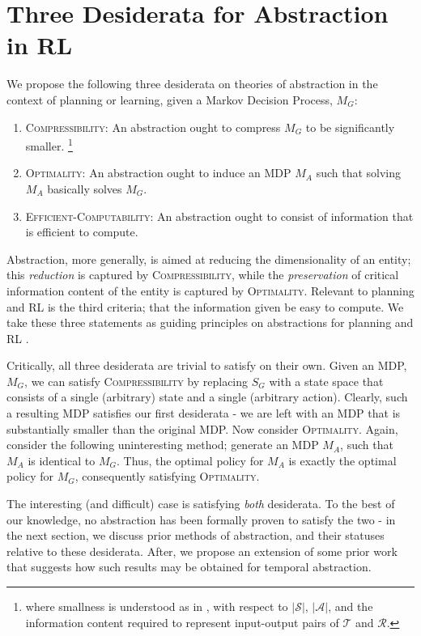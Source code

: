 \section{Three Desiderata for Abstraction in RL}

We propose the following three desiderata on theories of abstraction in the context of planning or learning, given a Markov Decision Process, $M_G$:
\begin{enumerate}
\item \textsc{Compressibility}: An abstraction ought to compress $M_G$ to be significantly smaller. \footnote{where smallness is understood as in \cite{littman1995complexity}, with respect to $|\mathcal{S}|$, $|\mathcal{A}|$, and the information content required to represent input-output pairs of $\mathcal{T}$ and $\mathcal{R}$.}
\item \textsc{Optimality}: An abstraction ought to induce an MDP $M_A$ such that solving $M_A$ basically solves $M_G$.
\item \textsc{Efficient-Computability}: An abstraction ought to consist of information that is efficient to compute.
\end{enumerate}

Abstraction, more generally, is aimed at reducing the dimensionality of an entity; this {\it reduction} is captured by \textsc{Compressibility}, while the {\it preservation} of critical information content of the entity is captured by \textsc{Optimality}. Relevant to planning and RL is the third criteria; that the information given be easy to compute. We take these three statements as guiding principles on abstractions for planning and \ac{RL} .

Critically, all three desiderata are trivial to satisfy on their own. Given an \ac{MDP}, $M_G$, we can satisfy \textsc{Compressibility} by replacing $S_G$ with a state space that consists of a single (arbitrary) state and a single (arbitrary action). Clearly, such a resulting \ac{MDP} satisfies our first desiderata - we are left with an MDP that is substantially smaller than the original MDP. Now consider \textsc{Optimality}. Again, consider the following uninteresting method; generate an MDP $M_A$, such that $M_A$ is identical to $M_G$. Thus, the optimal policy for $M_A$ is exactly the optimal policy for $M_G$, consequently satisfying \textsc{Optimality}.

The interesting (and difficult) case is satisfying {\it both} desiderata. To the best of our knowledge, no abstraction has been formally proven to satisfy the two - in the next section, we discuss prior methods of abstraction, and their statuses relative to these desiderata. After, we propose an extension of some prior work that suggests how such results may be obtained for temporal abstraction.